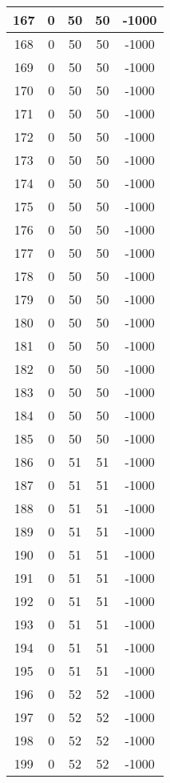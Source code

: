 \documentclass[letterpaper, 12pt]{article}
\begin{document}
\begin{longtable}{|c|c|c|c|c|}
\hline
167 & 0 & 50 & 50 & -1000 \\
\hline
168 & 0 & 50 & 50 & -1000 \\
\hline
169 & 0 & 50 & 50 & -1000 \\
\hline
170 & 0 & 50 & 50 & -1000 \\
\hline
171 & 0 & 50 & 50 & -1000 \\
\hline
172 & 0 & 50 & 50 & -1000 \\
\hline
173 & 0 & 50 & 50 & -1000 \\
\hline
174 & 0 & 50 & 50 & -1000 \\
\hline
175 & 0 & 50 & 50 & -1000 \\
\hline
176 & 0 & 50 & 50 & -1000 \\
\hline
177 & 0 & 50 & 50 & -1000 \\
\hline
178 & 0 & 50 & 50 & -1000 \\
\hline
179 & 0 & 50 & 50 & -1000 \\
\hline
180 & 0 & 50 & 50 & -1000 \\
\hline
181 & 0 & 50 & 50 & -1000 \\
\hline
182 & 0 & 50 & 50 & -1000 \\
\hline
183 & 0 & 50 & 50 & -1000 \\
\hline
184 & 0 & 50 & 50 & -1000 \\
\hline
185 & 0 & 50 & 50 & -1000 \\
\hline
186 & 0 & 51 & 51 & -1000 \\
\hline
187 & 0 & 51 & 51 & -1000 \\
\hline
188 & 0 & 51 & 51 & -1000 \\
\hline
189 & 0 & 51 & 51 & -1000 \\
\hline
190 & 0 & 51 & 51 & -1000 \\
\hline
191 & 0 & 51 & 51 & -1000 \\
\hline
192 & 0 & 51 & 51 & -1000 \\
\hline
193 & 0 & 51 & 51 & -1000 \\
\hline
194 & 0 & 51 & 51 & -1000 \\
\hline
195 & 0 & 51 & 51 & -1000 \\
\hline
196 & 0 & 52 & 52 & -1000 \\
\hline
197 & 0 & 52 & 52 & -1000 \\
\hline
198 & 0 & 52 & 52 & -1000 \\
\hline
199 & 0 & 52 & 52 & -1000 \\
\hline
\end{longtable}
\end{document}

